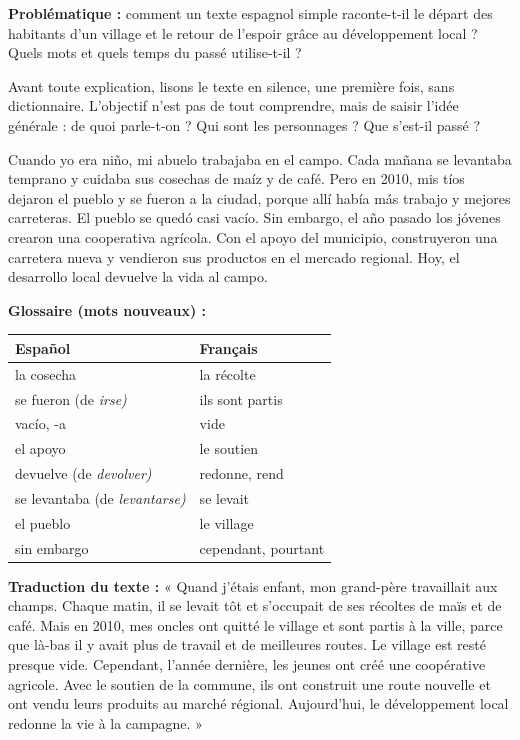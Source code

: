 \documentclass[11pt]{article}
\newcounter{popsec}
\newcounter{popsub}
\newcommand{\courssub}[1]{%
  \stepcounter{popsub}%
  \par\vspace{9pt}\noindent{\popxbold\fontsize{11.5}{13}\selectfont\color{popink}{\color{poporange}\thepopsec.\thepopsub}\hspace{6pt}#1}\par\nopagebreak\vspace{4pt}
}
\newcommand{\esp}[1]{\ifmmode\text{\textit{#1}}\else\begingroup\selectlanguage{spanish}\itshape #1\endgroup\fi}
\begin{document}
\textbf{Problématique :} comment un texte espagnol simple raconte-t-il le départ des habitants d'un village et le retour de l'espoir grâce au développement local ? Quels mots et quels temps du passé utilise-t-il ?

\courssub{Lecture globale silencieuse du texte}

Avant toute explication, lisons le texte en silence, une première fois, sans dictionnaire. L'objectif n'est pas de tout comprendre, mais de saisir l'idée générale : de quoi parle-t-on ? Qui sont les personnages ? Que s'est-il passé ?

\begin{textebox}
Cuando yo era niño, mi abuelo trabajaba en el campo. Cada mañana se levantaba temprano y cuidaba sus cosechas de maíz y de café. Pero en 2010, mis tíos dejaron el pueblo y se fueron a la ciudad, porque allí había más trabajo y mejores carreteras. El pueblo se quedó casi vacío. Sin embargo, el año pasado los jóvenes crearon una cooperativa agrícola. Con el apoyo del municipio, construyeron una carretera nueva y vendieron sus productos en el mercado regional. Hoy, el desarrollo local devuelve la vida al campo.
\end{textebox}

\textbf{Glossaire (mots nouveaux) :}

\begin{center}
\begin{tabularx}{\linewidth}{|X|X|}
\hline
\rowcolor{popblueL} \textbf{Español} & \textbf{Français} \\
\hline
la cosecha & la récolte \\
\hline
se fueron (de \esp{irse}) & ils sont partis \\
\hline
vacío, -a & vide \\
\hline
el apoyo & le soutien \\
\hline
devuelve (de \esp{devolver}) & redonne, rend \\
\hline
se levantaba (de \esp{levantarse}) & se levait \\
\hline
el pueblo & le village \\
\hline
sin embargo & cependant, pourtant \\
\hline
\end{tabularx}
\end{center}

\textbf{Traduction du texte :} « Quand j'étais enfant, mon grand-père travaillait aux champs. Chaque matin, il se levait tôt et s'occupait de ses récoltes de maïs et de café. Mais en 2010, mes oncles ont quitté le village et sont partis à la ville, parce que là-bas il y avait plus de travail et de meilleures routes. Le village est resté presque vide. Cependant, l'année dernière, les jeunes ont créé une coopérative agricole. Avec le soutien de la commune, ils ont construit une route nouvelle et ont vendu leurs produits au marché régional. Aujourd'hui, le développement local redonne la vie à la campagne. »
\end{document}
